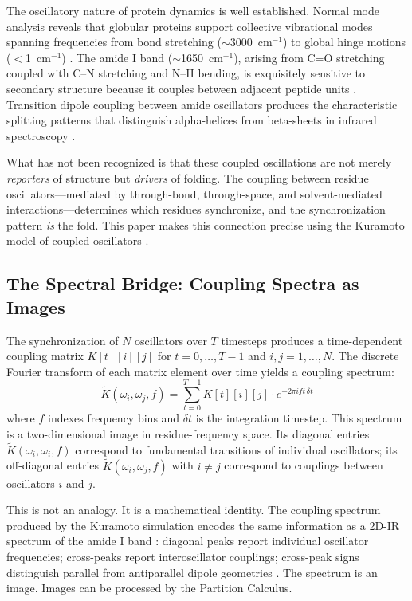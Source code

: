 \documentclass[11pt,twocolumn,a4paper]{article}
\theoremstyle{definition}
\theoremstyle{remark}
\newcommand{\Ktilde}{\tilde{K}}
\newcommand{\natfreq}{\omega}
\begin{document}
The oscillatory nature of protein dynamics is well established. Normal mode analysis reveals that globular proteins support collective vibrational modes spanning frequencies from bond stretching ($\sim$3000~cm$^{-1}$) to global hinge motions ($<$1~cm$^{-1}$) \citep{go1983, bahar1997, tirion1996}. The amide I band ($\sim$1650~cm$^{-1}$), arising from C=O stretching coupled with C--N stretching and N--H bending, is exquisitely sensitive to secondary structure because it couples between adjacent peptide units \citep{krimm1986, barth2007}. Transition dipole coupling between amide oscillators produces the characteristic splitting patterns that distinguish alpha-helices from beta-sheets in infrared spectroscopy \citep{torii1992}.

What has not been recognized is that these coupled oscillations are not merely \emph{reporters} of structure but \emph{drivers} of folding. The coupling between residue oscillators---mediated by through-bond, through-space, and solvent-mediated interactions---determines which residues synchronize, and the synchronization pattern \emph{is} the fold. This paper makes this connection precise using the Kuramoto model of coupled oscillators \citep{kuramoto1984, strogatz2000, acebron2005}.

\subsection{The Spectral Bridge: Coupling Spectra as Images}

The synchronization of $N$ oscillators over $T$ timesteps produces a time-dependent coupling matrix $K[t][i][j]$ for $t = 0, \ldots, T-1$ and $i, j = 1, \ldots, N$. The discrete Fourier transform of each matrix element over time yields a coupling spectrum:
\begin{equation}
\label{eq:coupling_spectrum_intro}
\Ktilde(\natfreq_i, \natfreq_j, f) = \sum_{t=0}^{T-1} K[t][i][j] \cdot e^{-2\pi i f t \, \delta t}
\end{equation}
where $f$ indexes frequency bins and $\delta t$ is the integration timestep. This spectrum is a two-dimensional image in residue-frequency space. Its diagonal entries $\Ktilde(\natfreq_i, \natfreq_i, f)$ correspond to fundamental transitions of individual oscillators; its off-diagonal entries $\Ktilde(\natfreq_i, \natfreq_j, f)$ with $i \neq j$ correspond to couplings between oscillators $i$ and $j$.

This is not an analogy. It is a mathematical identity. The coupling spectrum produced by the Kuramoto simulation encodes the same information as a 2D-IR spectrum of the amide I band \citep{hamm2011, hochstrasser2007}: diagonal peaks report individual oscillator frequencies; cross-peaks report interoscillator couplings; cross-peak signs distinguish parallel from antiparallel dipole geometries \citep{kim2009, ganim2008}. The spectrum is an image. Images can be processed by the Partition Calculus.
\end{document}
